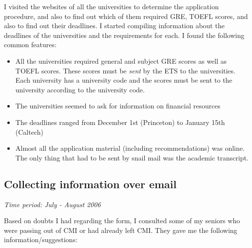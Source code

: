 \documentclass[a4paper]{amsart}
\begin{document}
I visited the websites of all the universities to determine the application
procedure, and also to find out which of them required GRE, TOEFL scores,
and also to find out their deadlines. I started compiling information
about the deadlines of the universities and the requirements for each.
I found the following common features:

\begin{itemize}

\item All the universities required general and subject GRE scores
  as well as TOEFL scores. These scores must be {\em sent} by the ETS
  to the universities. Each university has a university code
  and the scores must be sent to the university according
  to the university code.

\item The universities seemed to ask for information on financial resources

\item The deadlines ranged from December 1st (Princeton) to January
  15th (Caltech)

\item Almost all the application material (including recommendations)
  was online. The only thing that had to be sent by snail mail was the
  academic transcript.

\end{itemize}

\subsection{Collecting information over email}

{\em Time period: July - August 2006}

Based on doubts I had regarding the form, I consulted some of my seniors
who were passing out of CMI or had already left CMI. They gave me the
following information/suggestions:
\end{document}
